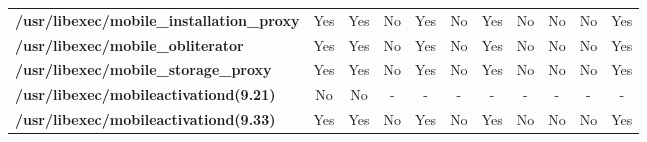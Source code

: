 \begin{center}
{\begin{tabular}{|>{\bfseries} l | C | C | C | C | C | C | C | C | C | C |}
					/usr/libexec/mobile\_installation\_proxy & Yes & Yes & \color{green}No & \color{red}Yes & \color{green}No & \color{red}Yes & No & No & \color{green}No & \color{red}Yes\\ 
					/usr/libexec/mobile\_obliterator & Yes & Yes & \color{green}No & \color{red}Yes & \color{green}No & \color{red}Yes & No & No & \color{green}No & \color{red}Yes\\ 
					/usr/libexec/mobile\_storage\_proxy & Yes & Yes & \color{green}No & \color{red}Yes & \color{green}No & \color{red}Yes & No & No & \color{green}No & \color{red}Yes\\ 
					/usr/libexec/mobileactivationd(9.21) & No & No & - & - & - & - & - & - & - & -\\ 
					/usr/libexec/mobileactivationd(9.33) & Yes & Yes & \color{green}No & \color{red}Yes & \color{green}No & \color{red}Yes & No & No & \color{green}No & \color{red}Yes\\ 

			\end{tabular}
		}
	\end{center}




